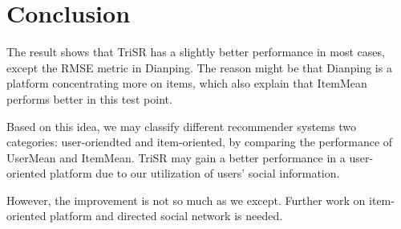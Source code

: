 \documentclass{article}
\begin{document}
\section{Conclusion}
\label{conclusion}
The result shows that TriSR has a slightly better performance in most cases, except 
the RMSE metric in Dianping. The reason might be that Dianping is a platform 
concentrating more on items, which also explain that ItemMean performs better in this test point. 

Based on this idea, we may classify different recommender systems two categories: 
user-oriendted and item-oriented, by comparing the performance of UserMean and ItemMean.
TriSR may gain a better performance in a user-oriented platform due to
our utilization of users' social information.

However, the improvement is not so much as we except. Further work on item-oriented 
platform and directed social network is needed. 



\end{document}
